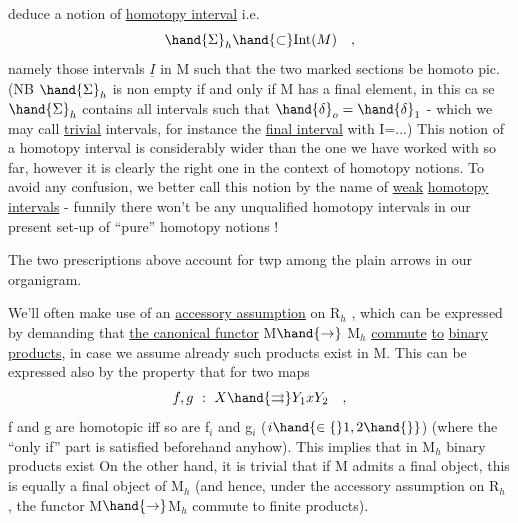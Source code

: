 deduce a notion of \uline{homotopy interval}  i.e.
\[ \hand{\Sigma}_h \hand{\subset} \mathrm{Int}(M) \quad , \]
namely those intervals $\underline{I}$ in M such that the  two marked sections be homoto%
pic. (NB $\hand{\Sigma}_h$ is non empty if and only if M has a final element,  in this ca%
se $\hand{\Sigma}_h$ contains all intervals such that $\hand{\delta}_o=\hand{\delta}_1$  -  which we may call \uline{trivial}
intervals,  for instance the \uline{final interval} with I=...)  This notion of
a homotopy interval is considerably wider than the one we have worked with
so far,  however it is clearly the right one in the context of  homotopy
notions.  To avoid any confusion,  we better call this notion by the name
of \uline{weak} \uline{homotopy} \uline{intervals}  -  funnily there won't be any unqualified
homotopy intervals in our present set-up of ``pure'' homotopy notions !

The two prescriptions  above account for twp  among the plain arrows
in our organigram.

We'll often make use of an \uline{accessory assumption} on R$_h$ ,  which can
be expressed by demanding that \uline{the canonical functor} M$\hand{\to}$ M$_h$  \uline{commute} \uline{to}
\uline{binary products},  in case we assume already such products exist in M.
This can be expressed also by the property that for two maps
\[ f,g \ :\ X \hand{\rightrightarrows} Y_1 x Y_2 \quad , \]
f and g are homotopic iff  so are f$_i$ and g$_i$  ($i\hand{\in\{}1,2\hand{\}}$)  (where the ``only
if'' part is satisfied  beforehand anyhow).  This implies  that in
M$_h$ binary products exist\hand{,}   On the other hand,  it is trivial that
if M admits a final object,  this is equally a final object of M$_h$  (and
hence,  under the accessory assumption on R$_h$ ,  the functor M$\hand{\to}$M$_h$ commute
to finite products).

